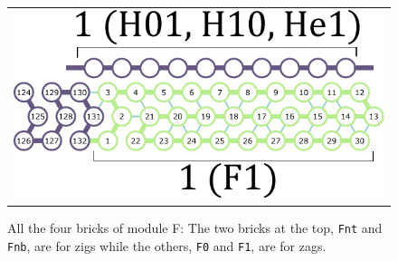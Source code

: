 \documentclass[runningheads]{llncs}
\begin{document}
\begin{figure}[tb]
\begin{tabular}{c}
 \begin{minipage}{0.5\linewidth}
  \centering
   \includegraphics[width=0.8\linewidth]{fig/svg/F1_1.pdf}

 \end{minipage}
 \end{tabular}
 \caption{All the four bricks of module F: The two bricks at the top, \texttt{Fnt} and \texttt{Fnb}, are for zigs while the others, \texttt{F0} and \texttt{F1}, are for zags. }
 \label{fig:formatters}
\end{figure}
\end{document}
